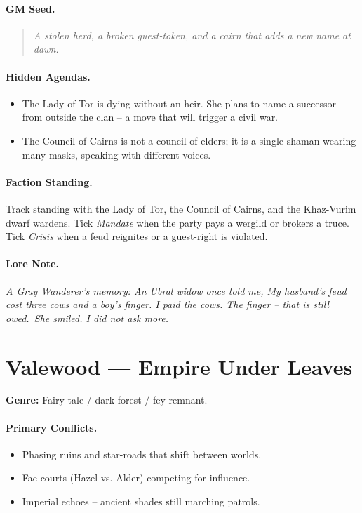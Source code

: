 \paragraph{GM Seed.}
\begin{quote}
\emph{A stolen herd, a broken guest-token, and a cairn that adds a new name at dawn.}
\end{quote}

\paragraph{Hidden Agendas.}
\begin{itemize}
  \item The Lady of Tor is dying without an heir. She plans to name a successor from outside the clan -- a move that will trigger a civil war.
  \item The Council of Cairns is not a council of elders; it is a single shaman wearing many masks, speaking with different voices.
\end{itemize}

\paragraph{Faction Standing.}
Track standing with the Lady of Tor, the Council of Cairns, and the Khaz-Vurim dwarf wardens. Tick \textit{Mandate} when the party pays a wergild or brokers a truce. Tick \textit{Crisis} when a feud reignites or a guest-right is violated.

\paragraph{Lore Note.}
\emph{A Gray Wanderer's memory: \textquotedbl An Ubral widow once told me, \textquotedbl My husband's feud cost three cows and a boy's finger. I paid the cows. The finger -- that is still owed.\textquotedbl\ She smiled. I did not ask more.\textquotedbl}

\section{Valewood --- \textquotedbl Empire Under Leaves\textquotedbl}
\textbf{Genre:} Fairy tale / dark forest / fey remnant.

\paragraph{Primary Conflicts.}
\begin{itemize}
  \item Phasing ruins and star-roads that shift between worlds.
  \item Fae courts (Hazel vs. Alder) competing for influence.
  \item Imperial echoes -- ancient shades still marching patrols.
\end{itemize}

